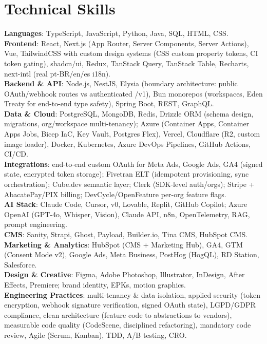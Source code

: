 \documentclass[a4paper,11pt]{article}
\begin{document}
\section{\textbf{Technical Skills}}
 \begin{itemize}[leftmargin=0.05in, label={}]
    \small{\item{
     \textbf{Languages}{: TypeScript, JavaScript, Python, Java, SQL, HTML, CSS.} \\
     \textbf{Frontend}{: React, Next.js (App Router, Server Components, Server Actions), Vue, TailwindCSS with custom design systems (CSS custom property tokens, CI token gating), shadcn/ui, Redux, TanStack Query, TanStack Table, Recharts, next-intl (real pt-BR/en/es i18n).} \\
     \textbf{Backend \& API}{: Node.js, NestJS, Elysia (boundary architecture: public OAuth/webhook routes vs authenticated /v1), Bun monorepos (workspaces, Eden Treaty for end-to-end type safety), Spring Boot, REST, GraphQL.} \\
     \textbf{Data \& Cloud}{: PostgreSQL, MongoDB, Redis, Drizzle ORM (schema design, migrations, org/workspace multi-tenancy); Azure (Container Apps, Container Apps Jobs, Bicep IaC, Key Vault, Postgres Flex), Vercel, Cloudflare (R2, custom image loader), Docker, Kubernetes, Azure DevOps Pipelines, GitHub Actions, CI/CD.} \\
     \textbf{Integrations}{: end-to-end custom OAuth for Meta Ads, Google Ads, GA4 (signed state, encrypted token storage); Fivetran ELT (idempotent provisioning, sync orchestration); Cube.dev semantic layer; Clerk (SDK-level auth/orgs); Stripe + AbacatePay/PIX billing; DevCycle/OpenFeature per-org feature flags.} \\
     \textbf{AI Stack}{: Claude Code, Cursor, v0, Lovable, Replit, GitHub Copilot; Azure OpenAI (GPT-4o, Whisper, Vision), Claude API, n8n, OpenTelemetry, RAG, prompt engineering.} \\
     \textbf{CMS}{: Sanity, Strapi, Ghost, Payload, Builder.io, Tina CMS, HubSpot CMS.} \\
     \textbf{Marketing \& Analytics}{: HubSpot (CMS + Marketing Hub), GA4, GTM (Consent Mode v2), Google Ads, Meta Business, PostHog (HogQL), RD Station, Salesforce.} \\
     \textbf{Design \& Creative}{: Figma, Adobe Photoshop, Illustrator, InDesign, After Effects, Premiere; brand identity, EPKs, motion graphics.} \\
     \textbf{Engineering Practices}{: multi-tenancy \& data isolation, applied security (token encryption, webhook signature verification, signed OAuth state), LGPD/GDPR compliance, clean architecture (feature code to abstractions to vendors), measurable code quality (CodeScene, disciplined refactoring), mandatory code review, Agile (Scrum, Kanban), TDD, A/B testing, CRO.} \\
    }}
 \end{itemize}
 \vspace{-10pt}
\end{document}
